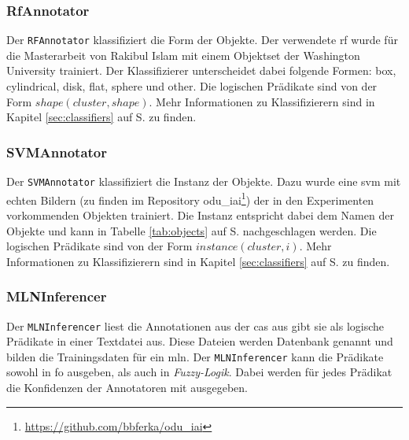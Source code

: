 \subsubsection{RfAnnotator}
Der \texttt{RFAnnotator} klassifiziert die Form der Objekte. Der verwendete \gls{rf} wurde für die Masterarbeit von Rakibul Islam \cite{rakib} mit einem Objektset der Washington University trainiert. Der Klassifizierer unterscheidet dabei folgende Formen: box, cylindrical, disk, flat, sphere und other. Die logischen Prädikate sind von der Form  $shape(cluster, shape)$. Mehr Informationen zu Klassifizierern sind in Kapitel \ref{sec:classifiers} auf S. \pageref{sec:classifiers} zu finden.

\subsubsection{SVMAnnotator}
Der \texttt{SVMAnnotator} klassifiziert die Instanz der Objekte. Dazu wurde eine \gls{svm} mit echten Bildern (zu finden im Repository odu\_iai\footnote{\url{https://github.com/bbferka/odu\_iai}}) der in den Experimenten vorkommenden Objekten trainiert. Die Instanz entspricht dabei dem Namen der Objekte und kann in Tabelle \ref{tab:objects} auf S.\pageref{tab:objects} nachgeschlagen werden. Die logischen Prädikate sind von der Form  $instance(cluster, i)$. Mehr Informationen zu Klassifizierern sind in Kapitel \ref{sec:classifiers} auf S. \pageref{sec:classifiers} zu finden.

\subsubsection{MLNInferencer}
\label{sec:mlnInferencer}
Der \texttt{MLNInferencer} liest die Annotationen aus der \gls{cas} aus gibt sie als logische Prädikate in einer Textdatei aus. Diese Dateien werden Datenbank genannt und bilden die Trainingsdaten für ein \gls{mln}. Der \texttt{MLNInferencer} kann die Prädikate sowohl in \gls{fo} ausgeben, als auch in \textit{Fuzzy-Logik}. Dabei werden für jedes Prädikat die Konfidenzen der Annotatoren mit ausgegeben.
